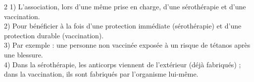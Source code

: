 \begin{multicols}{2}
1) L'association, lors d'une même prise en charge, d'une sérothérapie et d'une
vaccination.\\
2) Pour bénéficier à la fois d'une protection immédiate (sérothérapie) et d'une
protection durable (vaccination).\\
3) Par exemple : une personne non vaccinée exposée à un risque de tétanos après une
blessure.\\
4) Dans la sérothérapie, les anticorps viennent de l'extérieur (déjà fabriqués) ;
dans la vaccination, ils sont fabriqués par l'organisme lui-même.

\end{multicols}
\exercicesBanner
